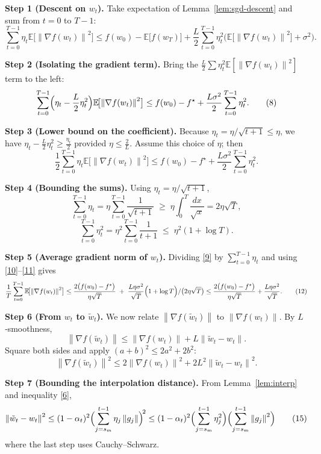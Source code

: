 \documentclass{article}
\newcommand{\E}{\mathbb{E}}
\newcommand{\norm}[1]{\left\lVert #1\right\rVert}
\begin{document}
\medskip
\noindent\textbf{Step 1 (Descent on $w_t$).}  
Take expectation of Lemma~\ref{lem:sgd-descent} and sum from $t=0$ to $T-1$:
\[
\sum_{t=0}^{T-1}\eta_t\E\!\bigl[\norm{\nabla f(w_t)}^2\bigr]
\le
f(w_0)-\E\!\bigl[f(w_T)\bigr]
+\frac{L}{2}\sum_{t=0}^{T-1}\eta_t^2\bigl(\E\!\bigl[\norm{\nabla f(w_t)}^2\bigr]+\sigma^2\bigr).
\tag{7}
\]

\noindent\textbf{Step 2 (Isolating the gradient term).}  
Bring the $\frac{L}{2}\sum\eta_t^2\E[\norm{\nabla f(w_t)}^2]$ term to the left:
\[
\sum_{t=0}^{T-1}\Bigl(\eta_t-\frac{L}{2}\eta_t^2\Bigr)\E\!\bigl[\norm{\nabla f(w_t)}^2\bigr]
\le
f(w_0)-f^\star+\frac{L\sigma^2}{2}\sum_{t=0}^{T-1}\eta_t^2 .
\tag{8}
\]

\noindent\textbf{Step 3 (Lower bound on the coefficient).}  
Because $\eta_t=\eta/\sqrt{t+1}\le \eta$, we have $\eta_t-\frac{L}{2}\eta_t^2\ge \frac{\eta_t}{2}$ provided $\eta\le \frac{2}{L}$. Assume this choice of $\eta$; then
\[
\frac{1}{2}\sum_{t=0}^{T-1}\eta_t\E\!\bigl[\norm{\nabla f(w_t)}^2\bigr]
\le
f(w_0)-f^\star+\frac{L\sigma^2}{2}\sum_{t=0}^{T-1}\eta_t^2 .
\tag{9}
\]

\noindent\textbf{Step 4 (Bounding the sums).}  
Using $\eta_t=\eta/\sqrt{t+1}$,
\[
\sum_{t=0}^{T-1}\eta_t = \eta\sum_{t=0}^{T-1}\frac{1}{\sqrt{t+1}}
\;\ge\;
\eta\int_{0}^{T}\frac{dx}{\sqrt{x}}=2\eta\sqrt{T},
\tag{10}
\]
\[
\sum_{t=0}^{T-1}\eta_t^2 = \eta^2\sum_{t=0}^{T-1}\frac{1}{t+1}
\;\le\;
\eta^2(1+\log T).
\tag{11}
\]

\noindent\textbf{Step 5 (Average gradient norm of $w_t$).}  
Dividing \eqref{9} by $\sum_{t=0}^{T-1}\eta_t$ and using \eqref{10}–\eqref{11} gives
\[
\frac{1}{T}\sum_{t=0}^{T-1}\E\!\bigl[\norm{\nabla f(w_t)}^2\bigr]
\le
\frac{2\bigl(f(w_0)-f^\star\bigr)}{\eta\sqrt{T}}
\;+\;
\frac{L\eta\sigma^2}{\sqrt{T}}\Bigl(1+\log T\Bigr)/\bigl(2\eta\sqrt{T}\bigr)
\le
\frac{2\bigl(f(w_0)-f^\star\bigr)}{\eta\sqrt{T}}
+\frac{L\eta\sigma^2}{\sqrt{T}} .
\tag{12}
\]

\noindent\textbf{Step 6 (From $w_t$ to $\tilde w_t$).}  
We now relate $\norm{\nabla f(\tilde w_t)}$ to $\norm{\nabla f(w_t)}$. By $L$‑smoothness,
\[
\norm{\nabla f(\tilde w_t)} \le \norm{\nabla f(w_t)} + L\norm{\tilde w_t-w_t}.
\tag{13}
\]
Square both sides and apply $(a+b)^2\le 2a^2+2b^2$:
\[
\norm{\nabla f(\tilde w_t)}^2
\le 2\norm{\nabla f(w_t)}^2 + 2L^2\norm{\tilde w_t-w_t}^2 .
\tag{14}
\]

\noindent\textbf{Step 7 (Bounding the interpolation distance).}  
From Lemma~\ref{lem:interp} and inequality \eqref{6},
\[
\norm{\tilde w_t-w_t}^2
\le (1-\alpha_t)^2\Bigl(\sum_{j=s_m}^{t-1}\eta_j\norm{g_j}\Bigr)^{\!2}
\le (1-\alpha_t)^2\Bigl(\sum_{j=s_m}^{t-1}\eta_j^2\Bigr)\Bigl(\sum_{j=s_m}^{t-1}\norm{g_j}^2\Bigr)
\tag{15}
\]
where the last step uses Cauchy–Schwarz.
\end{document}
